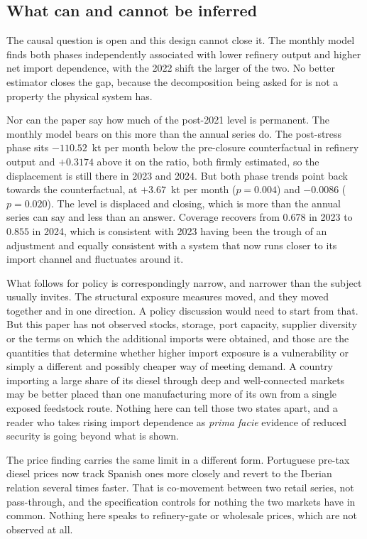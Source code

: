 \documentclass[11pt,a4paper]{article}
\begin{document}
\subsection{What can and cannot be inferred}

The causal question is open and this design cannot close it. The monthly model finds both phases
independently associated with lower refinery output and higher net import dependence, with the
2022 shift the larger of the two. No better estimator closes the gap, because the decomposition
being asked for is not a property the physical system has.

Nor can the paper say how much of the post-2021 level is permanent. The monthly model bears on this more than the annual series do. The post-stress phase sits
$-110.52$~kt per month below the pre-closure counterfactual in refinery output and $+0.3174$
above it on the ratio, both firmly estimated, so the displacement is still there in 2023 and
2024. But both phase trends point back towards the counterfactual, at $+3.67$~kt per month
($p=0.004$) and $-0.0086$ ($p=0.020$). The level is displaced and closing, which is more than
the annual series can say and less than an answer. Coverage recovers from $0.678$ in 2023 to
$0.855$ in 2024, which is consistent with 2023 having been the trough of an adjustment and equally consistent with a system that now runs closer to its import channel and
fluctuates around it.

What follows for policy is correspondingly narrow, and narrower than the subject usually
invites. The structural exposure measures moved, and they moved together and in one direction. A
policy discussion would need to start from that. But this paper has not observed stocks,
storage, port capacity, supplier diversity or the terms on which the additional imports were
obtained, and those are the quantities that determine whether higher import exposure is a
vulnerability or simply a different and possibly cheaper way of meeting demand. A country
importing a large share of its diesel through deep and well-connected markets may be better
placed than one manufacturing more of its own from a single exposed feedstock route. Nothing
here can tell those two states apart, and a reader who takes rising import dependence as
\emph{prima facie} evidence of reduced security is going beyond what is shown.

The price finding carries the same limit in a different form. Portuguese pre-tax diesel prices now
track Spanish ones more closely and revert to the Iberian relation several times
faster. That is co-movement between two retail series, not pass-through, and the specification
controls for nothing the two markets have in common. Nothing here speaks to refinery-gate or
wholesale prices, which are not observed at all.
\end{document}
